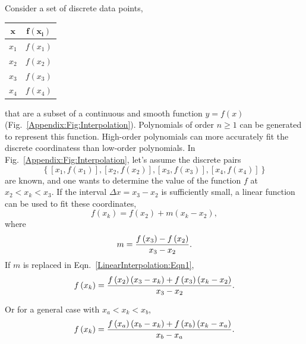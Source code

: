 Consider a set of discrete data points,
  \begin{center}
    \begin{tabular}{c | c }
        $\mathbf{x}$   & $\mathbf{f\left(x_{i}\right)}$ \\
        \hline
           $x_{1}$ &  $f\left(x_{1}\right)$ \\
           $x_{2}$ &  $f\left(x_{2}\right)$ \\
           $x_{3}$ &  $f\left(x_{3}\right)$ \\
           $x_{4}$ &  $f\left(x_{4}\right)$ \\
    \end{tabular}
  \end{center}
that are a subset of a continuous and smooth function $y=f(x)$ (Fig.~\ref{Appendix:Fig:Interpolation}). Polynomials of order $n\ge 1$ can be generated to represent this function. High-order polynomials can more accurately fit the discrete coordinatess than low-order polynomials. In Fig.~\ref{Appendix:Fig:Interpolation}, let's assume the discrete pairs 
  \begin{displaymath}
     \left\{\left[x_{1},f\left(x_{1}\right)\right], \left[x_{2},f\left(x_{2}\right)\right],\left[x_{3},f\left(x_{3}\right)\right], \left[x_{4},f\left(x_{4}\right)\right]\right\}
  \end{displaymath}
are known, and one wants to determine the value of the function $f$ at $x_{2} < x_{k} < x_{3}$. If the interval $\Delta x= x_{3}-x_{2}$ is sufficiently small, a linear function can be used to fit these coordinates,
   \begin{equation}
       f\left(x_{k}\right) = f\left(x_{2}\right) + m\left(x_{k}-x_{2}\right),\label{LinearInterpolation:Eqn1}
   \end{equation}
where 
   \begin{displaymath}
      m = \displaystyle\frac{f\left(x_{3}\right)-f\left(x_{2}\right)}{x_{3}-x_{2}}.
   \end{displaymath}
If $m$ is replaced in Eqn.~\ref{LinearInterpolation:Eqn1},
   \begin{displaymath}
       f\left(x_{k}\right) = \displaystyle\frac{f\left(x_{2}\right)\left(x_{3}-x_{k}\right) + f\left(x_{3}\right)\left(x_{k}-x_{2}\right)}{x_{3}-x_{2}}.
   \end{displaymath}
   
   \begin{shaded}
      Or for a general case with $x_{a} < x_{k} < x_{b}$,
        \begin{equation}\label{LinearInterpolation:Eqn1}
            f\left(x_{k}\right) = \displaystyle\frac{f\left(x_{a}\right)\left(x_{b}-x_{k}\right) + f\left(x_{b}\right)\left(x_{k}-x_{a}\right)}{x_{b}-x_{a}}.
        \end{equation}
   \end{shaded}

